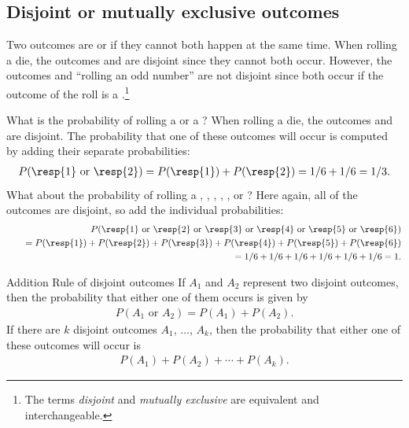 
\subsection{Disjoint or mutually exclusive outcomes}


Two outcomes are  or  if they cannot both happen at the same time. When rolling a die, the outcomes  and  are disjoint since they cannot both occur.  However, the outcomes  and ``rolling an odd number'' are not disjoint since both occur if the outcome of the roll is a .\footnote{The terms \emph{disjoint} and \emph{mutually exclusive} are equivalent and interchangeable.} 

What is the probability of rolling a  or a ? When rolling a die, the outcomes  and  are disjoint. The probability that one of these outcomes will occur is computed by adding their separate probabilities:
\begin{eqnarray*}
P(\text{\resp{1} or \resp{2}}) = P(\text{\resp{1}})+P(\text{\resp{2}}) = 1/6 + 1/6 = 1/3.
\end{eqnarray*}
What about  the probability of rolling a , , , , , or ? Here again, all of the outcomes are disjoint, so add the individual probabilities:
\begin{eqnarray*}
&&P(\text{\resp{1} or \resp{2} or \resp{3} or \resp{4} or \resp{5} or \resp{6}}) \\
	&&\quad= P(\text{\resp{1}})+P(\text{\resp{2}})+P(\text{\resp{3}})+P(\text{\resp{4}})+P(\text{\resp{5}})+P(\text{\resp{6}}) \\
	&&\quad= 1/6 + 1/6 + 1/6 + 1/6 + 1/6 + 1/6 = 1.
\end{eqnarray*}

\begin{onebox}{Addition Rule of disjoint outcomes} If $A_1$ and $A_2$ represent two disjoint outcomes, then the probability that either one of them occurs is given by
\begin{eqnarray*}
P(A_1\text{ or } A_2) = P(A_1) + P(A_2).
\end{eqnarray*}
If there are $k$ disjoint outcomes $A_1$, ..., $A_k$, then the probability that either one of these outcomes will occur is
\begin{eqnarray}
P(A_1) + P(A_2) + \cdots + P(A_k).
\end{eqnarray}
\end{onebox}

